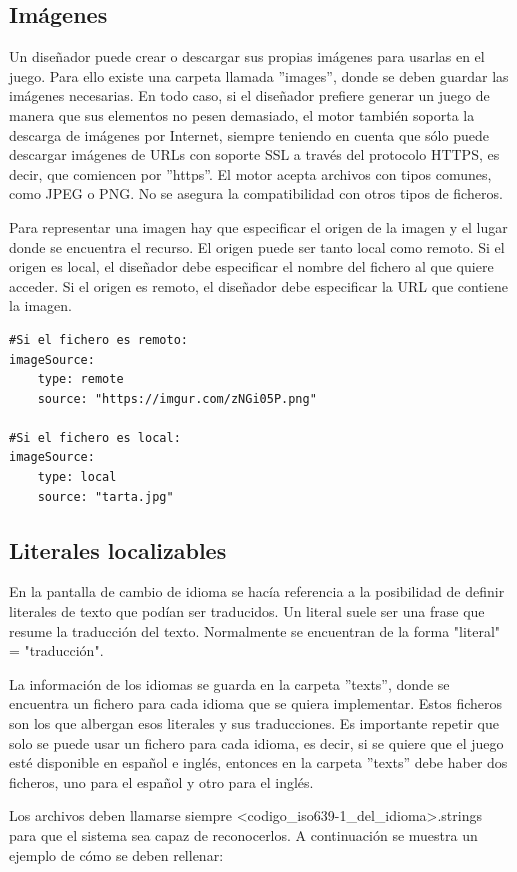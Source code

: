 \subsection{Imágenes}
Un diseñador puede crear o descargar sus propias imágenes para usarlas en el juego. Para ello existe una carpeta llamada ''images'', donde se deben guardar las imágenes necesarias.
En todo caso, si el diseñador prefiere generar un juego de manera que sus elementos no pesen demasiado, el motor también soporta la descarga de imágenes por Internet, siempre teniendo en cuenta que sólo puede descargar imágenes de URLs con soporte SSL a través del protocolo HTTPS, es decir, que comiencen por ''https''.
El motor acepta archivos con tipos comunes, como JPEG o PNG. No se asegura la compatibilidad con otros tipos de ficheros.

Para representar una imagen hay que especificar el origen de la imagen y el lugar donde se encuentra el recurso. El origen puede ser tanto local como remoto. Si el origen es local, el diseñador debe especificar el nombre del fichero al que quiere acceder. Si el origen es remoto, el diseñador debe especificar la URL que contiene la imagen.

\begin{lstlisting}
#Si el fichero es remoto:
imageSource:
	type: remote
	source: "https://imgur.com/zNGi05P.png"
	
#Si el fichero es local:
imageSource:
	type: local
	source: "tarta.jpg"
\end{lstlisting}

\subsection{Literales localizables}
En la pantalla de cambio de idioma se hacía referencia a la posibilidad de definir literales de texto que podían ser traducidos. Un literal suele ser una frase que resume la traducción del texto. Normalmente se encuentran de la forma "literal" = "traducción".

La información de los idiomas se guarda en la carpeta ''texts'', donde se encuentra un fichero para cada idioma que se quiera implementar. Estos ficheros son los que albergan esos literales y sus traducciones. Es importante repetir que solo se puede usar un fichero para cada idioma, es decir, si se quiere que el juego esté disponible en español e inglés, entonces en la carpeta ''texts'' debe haber dos ficheros, uno para el español y otro para el inglés.

Los archivos deben llamarse siempre <codigo\_iso639-1\_del\_idioma>.strings \cite{iso639-1Codes} para que el sistema sea capaz de reconocerlos.
A continuación se muestra un ejemplo de cómo se deben rellenar:

